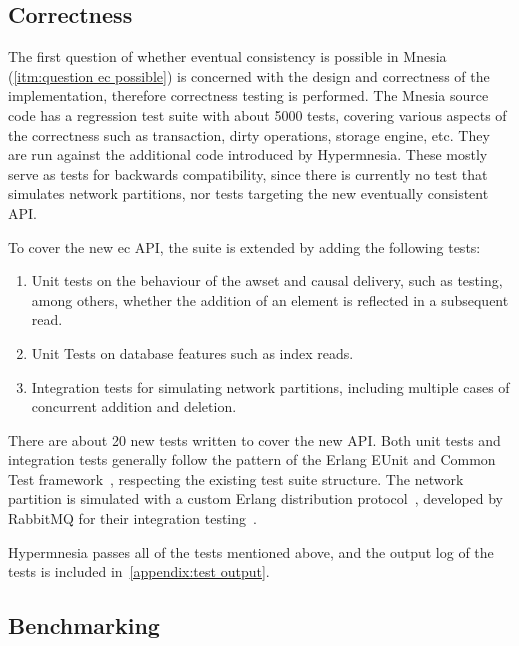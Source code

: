 \subsection{Correctness} \label{sec:eval correctness}

The first question of whether eventual consistency is possible in 
Mnesia (\cref{itm:question ec possible}) is
concerned with the design and correctness of the implementation, therefore
correctness testing is performed.
The Mnesia source code has a regression test suite with about 5000 tests, 
covering various aspects of the correctness such as transaction, 
dirty operations, storage engine, etc. They are
run against the additional code introduced by Hypermnesia. These
mostly serve as tests for backwards compatibility, since there is currently no 
test that simulates network partitions, nor tests targeting the new eventually 
consistent API\@.

To cover the new \acrshort{ec} API, the suite is extended by
adding the following tests:

\begin{enumerate}
  \item Unit tests on the behaviour of the \acrshort{awset}
  and causal delivery, such as testing, among others, whether the addition of an 
  element is reflected in a subsequent read.
  \item Unit Tests on database features such as index reads.
  \item Integration tests for simulating network partitions, including multiple 
  cases of concurrent addition and deletion.
\end{enumerate}

There are about 20 new tests written to cover the new API. 
Both unit tests and integration tests generally follow the pattern of the Erlang
EUnit and Common Test framework~\cite{ericssonab2023eunit,ericssonab2023ct},
respecting the existing test suite structure. The network partition is simulated with
a custom Erlang distribution protocol~\cite{ericssonab2023erldistro}, 
developed by RabbitMQ for their integration testing~\cite{rabbitmq2022inet_tcp_proxy}.

Hypermnesia passes all of the tests mentioned above, and the output
log of the tests is included in~\cref{appendix:test output}.

\subsection{Benchmarking} \label{sec:eval benchmarks}


